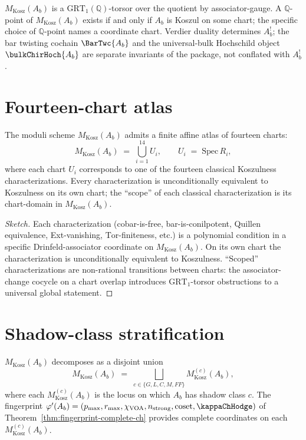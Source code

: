 \begin{remark}
$M_{\mathrm{Kosz}}(A_b)$ is a $\mathrm{GRT}_1(\mathbb{Q})$-torsor over
the quotient by associator-gauge. A $\mathbb{Q}$-point of
$M_{\mathrm{Kosz}}(A_b)$ exists if and only if $A_b$ is Koszul on some
chart; the specific choice of $\mathbb{Q}$-point names a coordinate
chart. Verdier duality determines $A_b^{!}$; the bar twisting cochain
$\BarTwc{A_b}$ and the universal-bulk Hochschild object
$\bulkChirHoch{A_b}$ are separate invariants of the package, not
conflated with $A_b^{!}$.
\end{remark}

\section{Fourteen-chart atlas}
\label{sec:mkosz-fourteen-charts}

\begin{theorem}
\label{thm:mkosz-fourteen-charts}
The moduli scheme $M_{\mathrm{Kosz}}(A_b)$ admits a finite affine
atlas of fourteen charts:
\[
 M_{\mathrm{Kosz}}(A_b)
 \;=\;
 \bigcup_{i=1}^{14} U_i,
 \qquad
 U_i \;=\; \mathrm{Spec}\,R_i,
\]
where each chart $U_i$ corresponds to one of the fourteen classical
Koszulness characterizations. Every characterization is
unconditionally equivalent to Koszulness on its own chart; the
``scope'' of each classical characterization is its chart-domain in
$M_{\mathrm{Kosz}}(A_b)$.
\end{theorem}

\begin{proof}[Sketch]
Each characterization (cobar-is-free, bar-is-conilpotent, Quillen
equivalence, Ext-vanishing, $\mathrm{Tor}$-finiteness, etc.) is a
polynomial condition in a specific Drinfeld-associator coordinate
on $M_{\mathrm{Kosz}}(A_b)$. On its own chart the characterization is
unconditionally equivalent to Koszulness. ``Scoped'' characterizations
are non-rational transitions between charts: the associator-change
cocycle on a chart overlap introduces $\mathrm{GRT}_1$-torsor
obstructions to a universal global statement.
\end{proof}

\section{Shadow-class stratification}
\label{sec:mkosz-shadow-stratification}

\begin{theorem}
\label{thm:mkosz-shadow-stratification}
$M_{\mathrm{Kosz}}(A_b)$ decomposes as a disjoint union
\[
 M_{\mathrm{Kosz}}(A_b)
 \;=\;
 \bigsqcup_{c \in \{G, L, C, M, FF\}} M_{\mathrm{Kosz}}^{(c)}(A_b),
\]
where each $M_{\mathrm{Kosz}}^{(c)}(A_b)$ is the locus on which $A_b$
has shadow class $c$. The fingerprint $\varphi'(A_b) = (p_{\max},
r_{\max}, \chi_{\mathrm{VOA}}, n_{\mathrm{strong}}, \mathrm{coset},
\kappaChHodge)$ of Theorem~\ref{thm:fingerprint-complete-ch} provides
complete coordinates on each $M_{\mathrm{Kosz}}^{(c)}(A_b)$.
\end{theorem}

